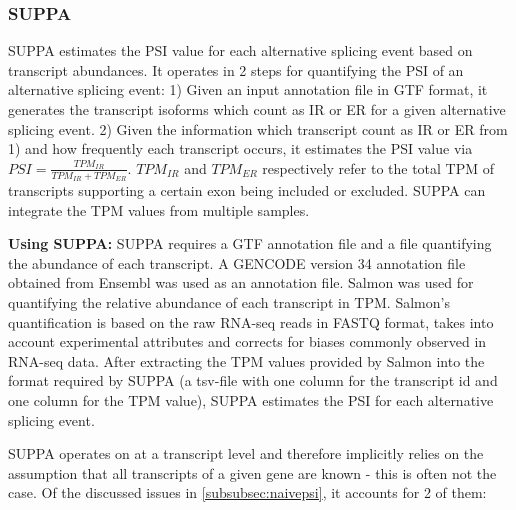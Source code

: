 \subsubsection{SUPPA}\label{subsubsec:suppa}
SUPPA \cite{suppa2} estimates the PSI value for each alternative splicing event based on transcript abundances. It operates in 2 steps for quantifying the PSI of an alternative splicing event:
1) Given an input annotation file in GTF format, it generates the transcript isoforms which count as IR or ER for a given alternative splicing event.
2) Given the information which transcript count as IR or ER from 1) and how frequently each transcript occurs, it estimates the PSI value via $PSI = \frac{TPM_{IR}}{TPM_{IR} + TPM_{ER}}$. $TPM_{IR}$ and $TPM_{ER}$ respectively refer to the total TPM of transcripts supporting a certain exon being included or excluded. SUPPA can integrate the TPM values from multiple samples.


\textbf{Using SUPPA:}
SUPPA requires a GTF annotation file and a file quantifying the abundance of each transcript. A GENCODE version 34 annotation file obtained from Ensembl was used as an annotation file. Salmon \cite{salmon} was used for quantifying the relative abundance of each transcript in TPM. Salmon's quantification is based on the raw RNA-seq reads in FASTQ format, takes into account experimental attributes and corrects for biases commonly observed in RNA-seq data. After extracting the TPM values provided by Salmon into the format required by SUPPA (a tsv-file with one column for the transcript id and one column for the TPM value), SUPPA estimates the PSI for each alternative splicing event.

SUPPA operates on at a transcript level and therefore implicitly relies on the assumption that all transcripts of a given gene are known - this is often not the case. Of the discussed issues in \ref{subsubsec:naivepsi}, it accounts for 2 of them: 

